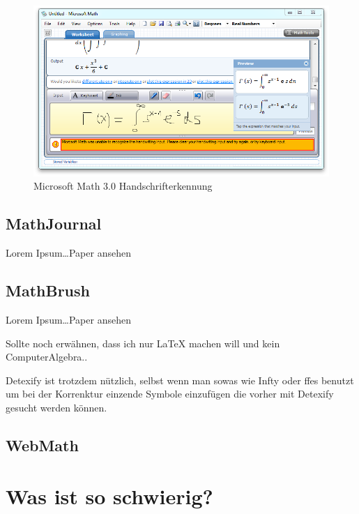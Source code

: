 \begin{figure}
  \begin{center}
    \includegraphics[width=\textwidth]{figures/ms-math-ink.png}
  \end{center}
  \caption{Microsoft Math 3.0 Handschrifterkennung}
  \label{fig:ms-math-ink}
\end{figure}


\subsection{MathJournal}

Lorem Ipsum\dots \TODO Paper ansehen

\subsection{MathBrush}
\label{sub:mathbrush}

Lorem Ipsum\dots \TODO Paper ansehen \cite{Labahn:2008p10301}


\TODO Sollte noch erwähnen, dass ich nur LaTeX machen will und kein ComputerAlgebra..

\TODO Detexify ist trotzdem nützlich, selbst wenn man sowas wie Infty oder ffes benutzt um bei der Korrenktur einzende Symbole einzufügen die vorher mit Detexify gesucht werden können.

\subsection{WebMath}

\TODO \cite{Vuong:2010p10279}

\section{Was ist so schwierig?}

